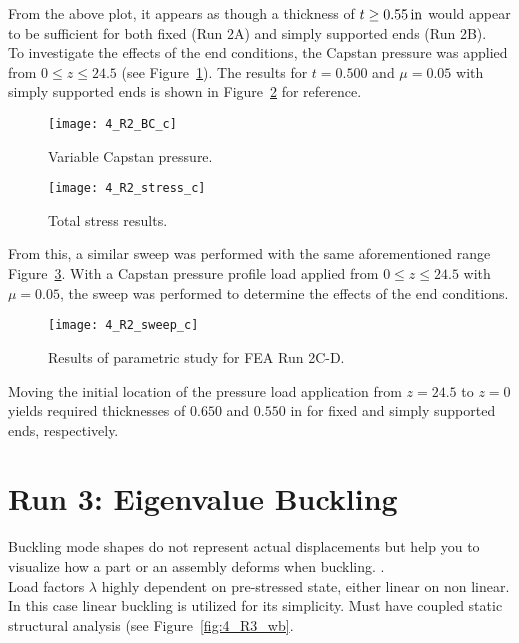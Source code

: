 From the above plot, it appears as though a thickness of $t \geq 0.55 \,\mathrm{in}$ would appear to be sufficient for both fixed (Run 2A) and simply supported ends (Run 2B).\\

To investigate the effects of the end conditions, the Capstan pressure was applied from $0 \leq z \leq 24.5$ (see Figure~\ref{fig:4_R2_BC_c}). The results for $t=0.500$ and $\mu=0.05$ with simply supported ends is shown in Figure~\ref{fig:4_R2_stress_c} for reference.
\begin{figure}[H]
	\centering
	\texttt{[image: 4\_R2\_BC\_c]}
	\caption{Variable Capstan pressure.}
	\label{fig:4_R2_BC_c}
\end{figure}

\begin{figure}[H]
	\centering
	\texttt{[image: 4\_R2\_stress\_c]}
	\caption{Total stress results.}
	\label{fig:4_R2_stress_c}
\end{figure}

From this, a similar sweep was performed with the same aforementioned range Figure~\ref{fig:4_R2_sweep2}. With a Capstan pressure profile load applied from $0 \leq z \leq 24.5$ with $\mu=0.05$, the sweep was performed to determine the effects of the end conditions.

\begin{figure}[H]
	\centering
	\texttt{[image: 4\_R2\_sweep\_c]}
	\caption{Results of parametric study for FEA Run 2C-D.}
	\label{fig:4_R2_sweep2}
\end{figure}

Moving the initial location of the pressure load application from $z=24.5$ to $z=0$ yields required thicknesses of $0.650$ and $0.550$ in for fixed and simply supported ends, respectively.

\section{Run 3: Eigenvalue Buckling}
\label{section:4_R3}

Buckling mode shapes do not represent actual displacements but help you to visualize how a part or an assembly deforms when buckling. \cite{ANSYS}. \\

Load factors $\lambda$ highly dependent on pre-stressed state, either linear on non linear.\\

In this case linear buckling is utilized for its simplicity. Must have coupled static structural analysis (see Figure~\ref{fig:4_R3_wb}.


